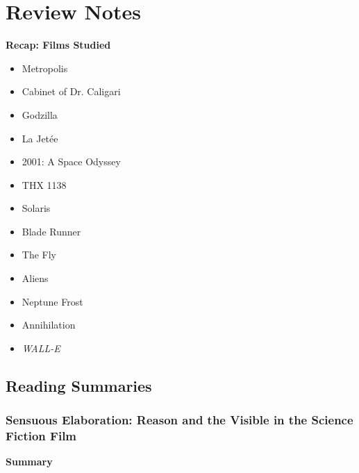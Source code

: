 \documentclass[11pt,fleqn]{book} %
\begin{document}
\chapter{Review Notes}
\textbf{Recap: Films Studied}
\begin{itemize}
    \item Metropolis
    \item Cabinet of Dr. Caligari 
    \item Godzilla
    \item La Jetée
    \item 2001: A Space Odyssey
    \item THX 1138
    \item Solaris
    \item Blade Runner
    \item The Fly
    \item Aliens
    \item Neptune Frost
    \item Annihilation
    \item \textit{WALL-E}
\end{itemize}


\section{Reading Summaries}
\subsection{Sensuous Elaboration: Reason and the Visible in the Science Fiction Film}
\textbf{Summary}
\end{document}
